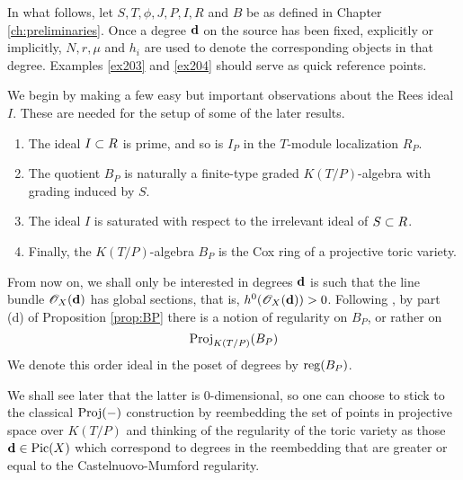 \documentclass[fleqn,reqno]{amsart}
\numberwithin{first}{chapter}
\begin{document}



\begin{paragraf}
In what follows, let $S,T,\phi,J,P,I,R$ and $B$ be as defined in Chapter \ref{ch:preliminaries}.
Once a degree $\mathbf d$ on the source has been fixed, explicitly or implicitly,
$N,r,\mu$ and $h_i$ are used to denote the corresponding objects in that degree.
Examples \ref{ex203} and \ref{ex204} should serve as quick reference points.
\end{paragraf}

\begin{paragraf*}
We begin by making a few easy but important observations about the Rees ideal $I$.
These are needed for the setup of some of the later results.
\end{paragraf*}

\begin{proposition}
\label{prop:BP}
\begin{enumerate}[label=\normalfont(\alph*)]
\item
The ideal $I\subset R$ is prime, and so is $I_P$ in the $T$-module localization $R_P$.
\item
The quotient $B_P$ is naturally a finite-type graded $K(T/P)$-algebra
with grading induced by $S$.
\item
The ideal $I$ is saturated with respect to the irrelevant ideal of $S\subset R$.
\item
Finally, the $K(T/P)$-algebra $B_P$ is the Cox ring of a projective toric variety.
\end{enumerate}
\end{proposition}

\begin{paragraf}
\label{par:describe-d}
From now on, we shall only be interested in degrees $\mathbf d$ is such that the line bundle
$\mathscr{O}_X(\mathbf d)$ has global sections, that is, $h^0(\mathscr{O}_X(\mathbf d))>0$.
Following \citet{03-Maclagan-Smith}, by part (d) of Proposition \ref{prop:BP}
there is a notion of regularity on $B_P$, or rather on
\[
\operatorname{Proj}_{K(T/P)}(B_P)
\]
We denote this order ideal in the poset of degrees by $\operatorname{reg}(B_P)$.

We shall see later that the latter is $0$-dimensional, so one can choose to
stick to the classical $\operatorname{Proj}(-)$ construction by reembedding the set of points
in projective space over $K(T/P)$ and thinking of the regularity
of the toric variety as those $\mathbf d\in\operatorname{Pic}(X)$ which correspond to degrees in the
reembedding that are greater or equal to the Castelnuovo-Mumford regularity.
\end{paragraf}
\end{document}
